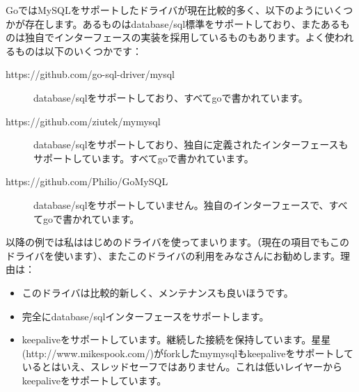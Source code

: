 GoではMySQLをサポートしたドライバが現在比較的多く、以下のようにいくつかが存在します。あるものはdatabase/sql標準をサポートしており、またあるものは独自でインターフェースの実装を採用しているものもあります。よく使われるものは以下のいくつかです：

\begin{description}
  \item[https://github.com/go-sql-driver/mysql] database/sqlをサポートしており、すべてgoで書かれています。
  \item[https://github.com/ziutek/mymysql] database/sqlをサポートしており、独自に定義されたインターフェースもサポートしています。すべてgoで書かれています。
  \item[https://github.com/Philio/GoMySQL] database/sqlをサポートしていません。独自のインターフェースで、すべてgoで書かれています。
\end{description}

以降の例では私ははじめのドライバを使ってまいります。（現在の項目でもこのドライバを使います）、またこのドライバの利用をみなさんにお勧めします。理由は：

\begin{itemize}
  \item このドライバは比較的新しく、メンテナンスも良いほうです。
  \item 完全にdatabase/sqlインターフェースをサポートします。
  \item keepaliveをサポートしています。継続した接続を保持しています。星星(http://www.mikespook.com/)がforkしたmymysqlもkeepaliveをサポートしているとはいえ、スレッドセーフではありません。これは低いレイヤーからkeepaliveをサポートしています。
\end{itemize}

